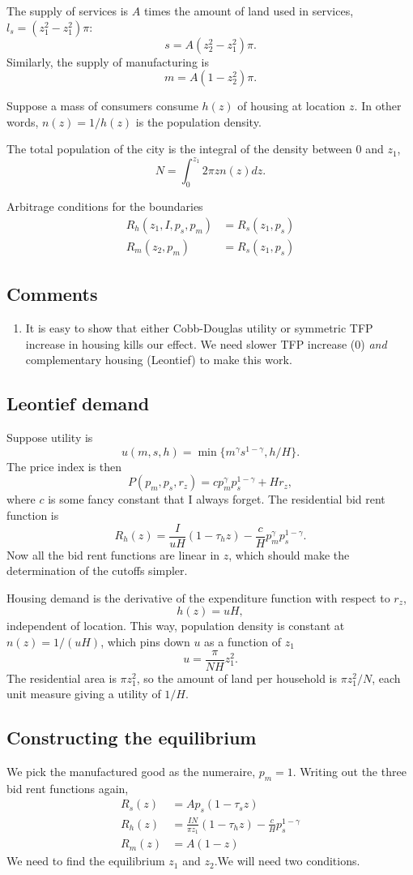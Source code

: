\documentclass{amsart}
\theoremstyle{definition}
\theoremstyle{remark}
\numberwithin{equation}{section}
\begin{document}
The supply of services is $A$ times the amount of land used in services, $l_s = (z_1^2-z_1^2)\pi$:
\[
s = A(z_2^2-z_1^2)\pi.
\]
Similarly, the supply of manufacturing is
\[
m = A(1-z_2^2)\pi.
\]

Suppose a mass of consumers consume $h(z)$ of housing at location $z$. In other words, $n(z) = 1/h(z)$ is the population density. 

The total population of the city is the integral of the density between $0$ and $z_1$,
\[
N = \int_{0}^{z_1}2\pi z n(z) dz.
\]

Arbitrage conditions for the boundaries
\begin{align}
R_h(z_1,I,p_s,p_m) &= R_s(z_1,p_s)\\
R_m(z_2,p_m) &= R_s(z_1,p_s)
\end{align}
\subsection{Comments}
\begin{enumerate}
  \item It is easy to show that either Cobb-Douglas utility or symmetric TFP increase in housing kills our effect. We need slower TFP increase (0) \emph{and} complementary housing (Leontief) to make this work.
\end{enumerate}
\subsection{Leontief demand}
Suppose utility is
\[
u(m,s,h) = \min\{m^\gamma s^{1-\gamma}, h/H\}.
\]
The price index is then
\[
P(p_m,p_s,r_z) = c p_m^\gamma p_s^{1-\gamma} + H r_z,
\]
where $c$ is some fancy constant that I always forget. The residential bid rent function is 
\[
R_h(z) = \frac{I}{uH}(1-\tau_h z) -\frac cH p_m^\gamma p_s^{1-\gamma}.
\]
Now all the bid rent functions are linear in $z$, which should make the determination of the cutoffs simpler.

Housing demand is the derivative of the expenditure function with respect to $r_z$,
\[
h(z) = u H,
\]
independent of location. This way, population density is constant at $n(z) = 1/(uH)$, which pins down $u$ as a function of $z_1$
\[
u = \frac{\pi}{N H}z_1^2.
\]
The residential area is $\pi z_1^2$, so the amount of land per household is $\pi z_1^2/N$, each unit measure giving a utility of $1/H$.

\subsection{Constructing the equilibrium}
We pick the manufactured good as the  numeraire, $p_m=1$. Writing out the three bid rent functions again,
\begin{align*}
R_s(z) &= Ap_s(1-\tau_s z)\\
R_h(z) &= \frac{IN}{\pi z_1}(1-\tau_h z) -\frac {c}{H} p_s^{1-\gamma}\\
R_m(z) &= A(1-z)
\end{align*}
We need to find the equilibrium $z_1$ and $z_2$.We will need two conditions. 
\end{document}
